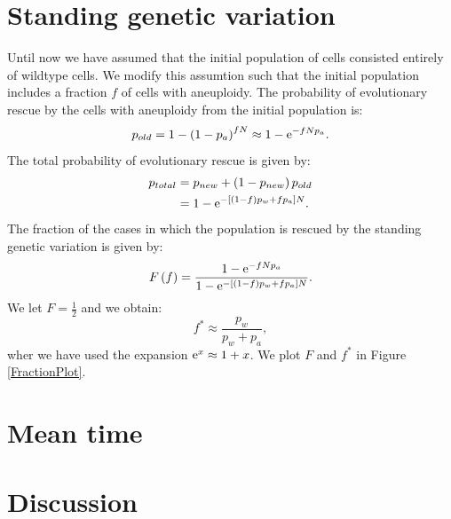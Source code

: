 \documentclass[11pt,a4paper]{article}
\newcommand{\e}{{\rm e}}
\begin{document}
\section{Standing genetic variation}
Until now we have assumed that the initial population of cells consisted entirely of wildtype cells. We modify this assumtion such that the initial population includes a fraction $f$ of cells with aneuploidy. The probability of evolutionary rescue by the cells with aneuploidy from the initial population is:
\begin{equation*}
p_{old}=1-\left(1-p_a\right)^{fN}\approx 1-\e^{-fNp_a}.
\end{equation*}
The total probability of evolutionary rescue is given by:
\begin{align}\nonumber
p_{total}&=p_{new}+\left(1-p_{new}\right)p_{old}\\
&=1-\e^{-\left[\left(1-f\right)p_w+fp_a\right]N}.
\end{align}
The fraction of the cases in which the population is rescued by the standing genetic variation is given by:
\begin{align*}
F\left(f\right)=\frac{ 1-\e^{-fNp_a}}{1-\e^{-\left[\left(1-f\right)p_w+fp_a\right]N}}.
\end{align*}
We let $F=\frac{1}{2}$ and we obtain:
\begin{equation*}
f^*\approx\frac{p_w}{p_w+p_a},
\end{equation*}
wher we have used the expansion $\e^x\approx 1+x$.
We plot $F$ and $f^*$ in Figure \ref{FractionPlot}.

\section{Mean time}

\section{Discussion}
\end{document}
